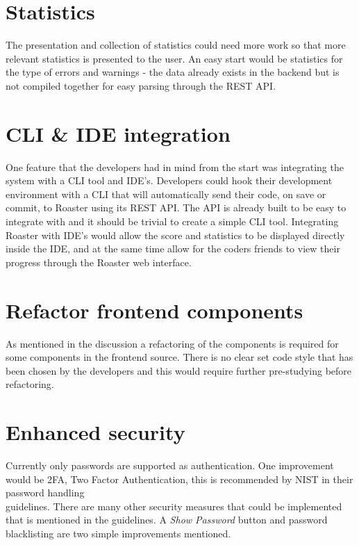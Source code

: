 \documentclass[12pt,a4paper]{report}
\begin{document}
\section{Statistics}
The presentation and collection of statistics could need more work so that more relevant statistics is presented to the user. An easy start would be statistics for the type of errors and warnings - the data already exists in the backend but is not compiled together for easy parsing through the REST API.

\section{CLI \& IDE integration}
One feature that the developers had in mind from the start was integrating the system with a CLI tool and IDE's. Developers could hook their development environment with a CLI that will automatically send their code, on save or commit, to Roaster using its REST API. The API is already built to be easy to integrate with and it should be trivial to create a simple CLI tool. Integrating Roaster with IDE's would allow the score and statistics to be displayed directly inside the IDE, and at the same time allow for the coders friends to view their progress through the Roaster web interface.

\section{Refactor frontend components}
As mentioned in the discussion a refactoring of the components is required for some components in the frontend source. There is no clear set code style that has been chosen by the developers and this would require further pre-studying before refactoring.


\section{Enhanced security}
Currently only passwords are supported as authentication. One improvement would be 2FA, Two Factor Authentication, this is recommended by NIST in their password handling \\ guidelines\cite{nist-passwords}. There are many other security measures that could be implemented that is mentioned in the guidelines. A \textit{Show Password} button and password blacklisting are two simple improvements mentioned\cite{oauth-nist}.
\end{document}
